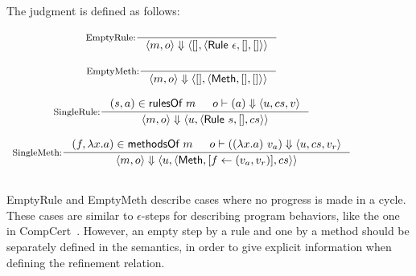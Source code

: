 \begin{definition}
  \label{def-semsstep}
  The judgment  is defined as follows:
  \begin{center}
    \begin{math}
      \begin{array}{c}
        \inference[EmptyRule:]{}
                  {\semsstep{m}{o}{\emptymap}
                    {\alpharule{\epsilon}}{\emptymap}{\emptymap}} \\
        \mbox{} \\
        \inference[EmptyMeth:]{}
                  {\semsstep{m}{o}{\emptymap}
                    {\alphameth}{\emptymap}{\emptymap}} \\
        \mbox{} \\
        \inference[SingleRule:]{\rulepair{s}{a} \in \rulesofm{m} & \semact{o}{a}{u}{cs}{v}}
                  {\semsstep{m}{o}{u}{\alpharule{s}}{\emptymap}{cs}} \\
        \mbox{} \\
        \inference[SingleMeth:]{\methodpair{f}{\lambda x.a} \in \methsofm{m} &
          \semact{o}{(\lambda x.a)\ v_a}{u}{cs}{v_r}}
                  {\semsstep{m}{o}{u}{\alphameth{}}{\lblupd{}{f}{(v_a, v_r)}}{cs}} \\
        \mbox{} \\
      \end{array}
    \end{math}
  \end{center}
\end{definition}

EmptyRule and EmptyMeth describe cases where no progress is made in a
cycle. These cases are similar to $\epsilon$-steps for describing
program behaviors, like the one in \todo{} CompCert~\cite{}. However,
an empty step by a rule and one by a method should be separately
defined in the \Substep{} semantics, in order to give explicit
information when defining the refinement relation.

